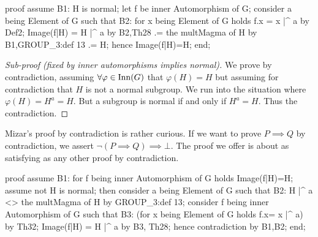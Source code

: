 \nwenddocs{}\endmoddef\nwstartdeflinemarkup{}\nwenddeflinemarkup
proof
  assume B1: H is normal;
  let f be inner Automorphism of G;
  consider a being Element of G such that
  B2: for x being Element of G holds f.x = x |^ a
  by Def2;
  Image(f|H) = H |^ a by B2,Th28
            .= the multMagma of H by B1,GROUP_3:def 13
            .= H;
  hence Image(f|H)=H;
end;
\nwendcode{}\nwdocspar

\begin{proof}[Sub-proof (fixed by inner automorphisms implies normal)]
We prove by contradiction, assuming $\forall\varphi\in\operatorname{Inn}(G)$ that $\varphi(H)=H$
but assuming for contradiction that $H$ is not a normal subgroup. We run
into the situation where $\varphi(H) = H^{a} = H$. But a subgroup is
normal if and only if $H^{a}=H$. Thus the contradiction.
\end{proof}

\begin{thm-remark}
Mizar's proof by contradiction is rather curious. If we want to prove
$P\implies Q$ by contradiction, we assert $\neg(P\implies
Q)\implies\bot$. The proof we offer is about as satisfying as any other
proof by contradiction.
\end{thm-remark}

\nwenddocs{}\endmoddef\nwstartdeflinemarkup{}\nwenddeflinemarkup
proof
  assume B1: for f being inner Automorphism of G holds Image(f|H)=H;
  assume not H is normal;
  then consider a being Element of G such that
  B2: H |^ a <> the multMagma of H
  by GROUP_3:def 13;
  consider f being inner Automorphism of G such that
  B3: (for x being Element of G holds f.x= x |^ a)
  by Th32;
  Image(f|H) = H |^ a by B3, Th28;
  hence contradiction by B1,B2;
end;
\nwendcode{}\nwdocspar
\nwenddocs{}%
